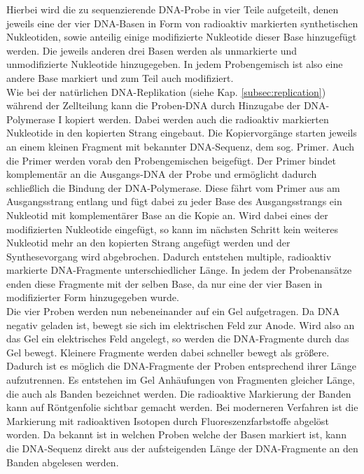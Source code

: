 Hierbei wird die zu sequenzierende DNA-Probe in vier Teile aufgeteilt, denen jeweils eine der vier DNA-Basen in Form von radioaktiv markierten synthetischen Nukleotiden, sowie anteilig einige modifizierte Nukleotide dieser Base hinzugefügt werden. Die jeweils anderen drei Basen werden als unmarkierte und unmodifizierte Nukleotide hinzugegeben. In jedem Probengemisch ist also eine andere Base markiert und zum Teil auch modifiziert. \\

Wie bei der natürlichen DNA-Replikation (siehe Kap. \ref{subsec:replication}) während der Zellteilung kann die Proben-DNA durch Hinzugabe der DNA-Polymerase I kopiert werden. Dabei werden auch die radioaktiv markierten Nukleotide in den kopierten Strang eingebaut. Die Kopiervorgänge starten jeweils an einem kleinen Fragment mit bekannter DNA-Sequenz, dem sog. Primer. Auch die Primer werden vorab den Probengemischen beigefügt. Der Primer bindet komplementär an die Ausgangs-DNA der Probe und  ermöglicht dadurch schließlich die Bindung der DNA-Polymerase. Diese fährt vom Primer aus am Ausgangsstrang entlang und fügt dabei zu jeder Base des Ausgangsstrangs ein Nukleotid mit komplementärer Base an die Kopie an. Wird dabei eines der modifizierten Nukleotide eingefügt, so kann im nächsten Schritt kein weiteres Nukleotid mehr an den kopierten Strang angefügt werden und der Synthesevorgang wird abgebrochen. Dadurch entstehen multiple, radioaktiv markierte DNA-Fragmente unterschiedlicher Länge. In jedem der Probenansätze enden diese Fragmente mit der selben Base, da nur eine der vier Basen in modifizierter Form hinzugegeben wurde. \\

Die vier Proben werden nun nebeneinander auf ein Gel aufgetragen. Da DNA negativ geladen ist, bewegt sie sich im elektrischen Feld zur Anode. Wird also an das Gel ein elektrisches Feld angelegt, so werden die DNA-Fragmente durch das Gel bewegt. Kleinere Fragmente werden dabei schneller bewegt als größere. Dadurch ist es möglich die DNA-Fragmente der Proben entsprechend ihrer Länge aufzutrennen. Es entstehen im Gel Anhäufungen von Fragmenten gleicher Länge, die auch als Banden bezeichnet werden. Die radioaktive Markierung der Banden kann auf Röntgenfolie sichtbar gemacht werden. Bei moderneren Verfahren ist die Markierung mit radioaktiven Isotopen durch Fluoreszenzfarbstoffe abgelöst worden. Da bekannt ist in welchen Proben welche der Basen markiert ist, kann die DNA-Sequenz direkt aus der aufsteigenden Länge der DNA-Fragmente an den Banden abgelesen werden. \\


